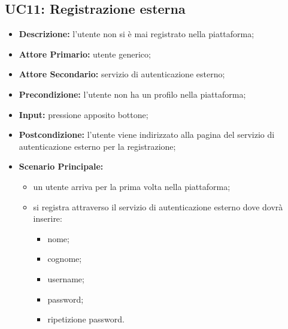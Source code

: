 \subsection{UC11: Registrazione esterna}
\label{sec:UC11}
\begin{itemize}
    \item \textbf{Descrizione:} l'utente non si è mai registrato nella piattaforma;
    \item \textbf{Attore Primario:} utente generico;
    \item \textbf{Attore Secondario:} servizio di autenticazione esterno;
    \item \textbf{Precondizione:} l'utente non ha un profilo nella piattaforma;
    \item \textbf{Input:} pressione apposito bottone;
    \item \textbf{Postcondizione:} l'utente viene indirizzato alla pagina del servizio di autenticazione esterno per la registrazione;
    \item \textbf{Scenario Principale:}
          \begin{itemize}
              \item un utente arriva per la prima volta nella piattaforma;
              \item si registra attraverso il servizio di autenticazione esterno dove dovrà inserire:
                    \begin{itemize}
                        \item nome;
                        \item cognome;
                        \item username;
                        \item password;
                        \item ripetizione password.
                    \end{itemize}
          \end{itemize}
\end{itemize}